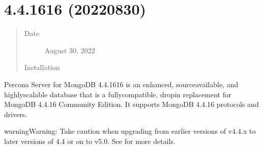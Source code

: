 \documentclass[letterpaper,10pt,english]{sphinxmanual}
\begin{document}
\section{ 4.4.16\sphinxhyphen{}16 (2022\sphinxhyphen{}08\sphinxhyphen{}30)}
\label{\detokenize{release_notes/4.4.16-16:percona-server-for-mongodb-4-4-16-16-2022-08-30}}\label{\detokenize{release_notes/4.4.16-16:psmdb-4-4-16-16}}\label{\detokenize{release_notes/4.4.16-16::doc}}\begin{quote}\begin{description}
\item[{Date}] \leavevmode
\sphinxAtStartPar
August 30, 2022

\item[{Installation}] \leavevmode
\sphinxAtStartPar
{}

\end{description}\end{quote}

\sphinxAtStartPar
Percona Server for MongoDB 4.4.16\sphinxhyphen{}16 is an enhanced, source\sphinxhyphen{}available, and highly\sphinxhyphen{}scalable database that is a
fully\sphinxhyphen{}compatible, drop\sphinxhyphen{}in replacement for MongoDB 4.4.16 Community Edition.
It supports MongoDB 4.4.16 protocols and drivers.

\begin{sphinxadmonition}{warning}{Warning:}
\sphinxAtStartPar
Take caution when upgrading from earlier versions of v4.4.x to later versions of 4.4 or on to v5.0. See  for more details.
\end{sphinxadmonition}
\end{document}
